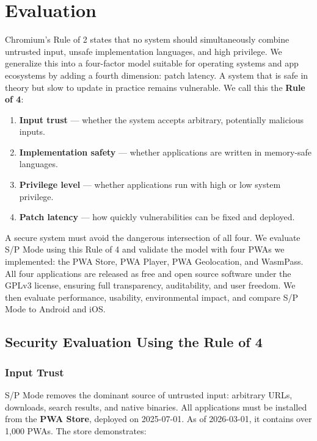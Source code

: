 \section{Evaluation}

Chromium’s Rule of 2 states that no system should simultaneously combine untrusted input, unsafe implementation languages, and high privilege. We generalize this into a four-factor model suitable for operating systems and app ecosystems by adding a fourth dimension: patch latency. A system that is safe in theory but slow to update in practice remains vulnerable. We call this the \textbf{Rule of 4}:

\begin{enumerate}
    \item \textbf{Input trust} — whether the system accepts arbitrary, potentially malicious inputs.
    \item \textbf{Implementation safety} — whether applications are written in memory-safe languages.
    \item \textbf{Privilege level} — whether applications run with high or low system privilege.
    \item \textbf{Patch latency} — how quickly vulnerabilities can be fixed and deployed.
\end{enumerate}

A secure system must avoid the dangerous intersection of all four. We evaluate S/P Mode using this Rule of 4 and validate the model with four PWAs we implemented: the PWA Store\cite{pwastore}, PWA Player\cite{pwaplayer}, PWA Geolocation\cite{pwageolocation}, and WasmPass\cite{wasmpass}. All four applications are released as free and open source software under the GPLv3 license, ensuring full transparency, auditability, and user freedom. We then evaluate performance, usability, environmental impact, and compare S/P Mode to Android and iOS.

\subsection{Security Evaluation Using the Rule of 4}

\subsubsection{Input Trust}

S/P Mode removes the dominant source of untrusted input: arbitrary URLs, downloads, search results, and native binaries. All applications must be installed from the \textbf{PWA Store}, deployed on 2025-07-01. As of 2026-03-01, it contains over 1,000 PWAs. The store demonstrates:

